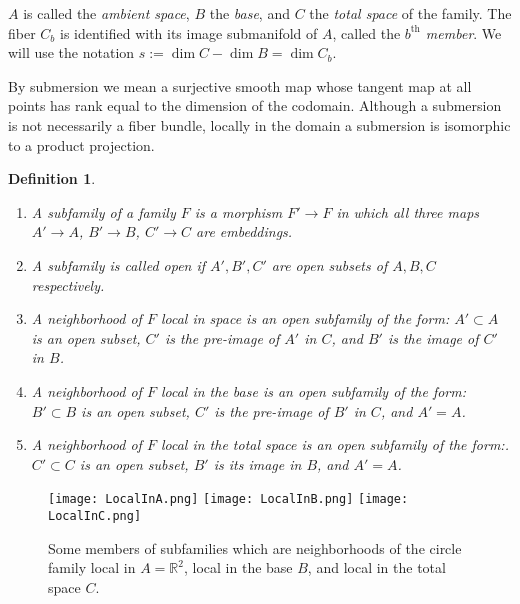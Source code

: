 \documentclass[12pt]{article}
\numberwithin{equation}{section}
\theoremstyle{plain}
\newtheorem{definition}{Definition}[section]
\theoremstyle{definition}
\newcommand{\R}{\mathbb{R}}
\newcommand{\ra}{\rightarrow}
\begin{document}
$A$ is called the \emph{ambient space}, $B$ the \emph{base}, and $C$ the \emph{total space} of the family. The fiber $C_b$ is identified with its image submanifold of $A$, called the \emph{$b^{\text{th}}$ member}. We will use the notation $s:=\dim C - \dim B=\dim C_{b}$.

By submersion we mean a surjective smooth map whose tangent map at all points has rank equal to the dimension of the codomain. Although a submersion is not necessarily a fiber bundle, locally in the domain a submersion is isomorphic to a product projection.

\begin{definition}\label{subfams}
\leavevmode
\begin{enumerate}
\itemsep0em
\item{A \emph{subfamily} of a family $F$ is a morphism $F'\ra F$ in which all three maps $A'\ra A$, $B'\ra B$, $C'\ra C$ are embeddings.}
\item{A subfamily is called \emph{open} if $A',B',C'$ are open subsets of $A,B,C$ respectively.}
\item{\label{localspace}A \emph{neighborhood of $F$ local in space} is an open subfamily of the form: $A'\subset A$ is an open subset, $C'$ is the pre-image of $A'$ in $C$, and $B'$ is the image of $C'$ in $B$.}
\item{A \emph{neighborhood of $F$ local in the base} is an open subfamily of the form: $B'\subset B$ is an open subset, $C'$ is the pre-image of $B'$ in $C$, and $A'=A$.}
\item{\label{ttlsp}A \emph{neighborhood of $F$ local in the total space} is an open subfamily of the form:. $C'\subset C$ is an open subset, $B'$ is its image in $B$, and $A'=A$.}
\end{enumerate}
\end{definition}
\begin{figure}[H]\label{circlePics}
 \centering
   \texttt{[image: LocalInA.png]}
   \texttt{[image: LocalInB.png]}
   \texttt{[image: LocalInC.png]}
   \caption{Some members of subfamilies which are neighborhoods of the circle family local in $A=\R^{2}$, local in the base $B$, and local in the total space $C$.}
\end{figure}
\end{document}
